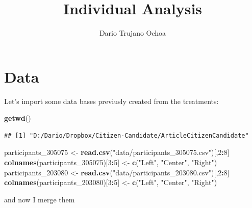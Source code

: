 \documentclass[]{article}
\title{Individual Analysis}
\author{Dario Trujano Ochoa}
\date{}
\newenvironment{Shaded}{\begin{snugshade}}{\end{snugshade}}
\newcommand{\KeywordTok}[1]{\textcolor[rgb]{0.13,0.29,0.53}{\textbf{#1}}}
\newcommand{\DecValTok}[1]{\textcolor[rgb]{0.00,0.00,0.81}{#1}}
\newcommand{\StringTok}[1]{\textcolor[rgb]{0.31,0.60,0.02}{#1}}
\newcommand{\OperatorTok}[1]{\textcolor[rgb]{0.81,0.36,0.00}{\textbf{#1}}}
\newcommand{\NormalTok}[1]{#1}
\begin{document}
\maketitle

{
\setcounter{tocdepth}{2}
\tableofcontents
}
\section{Data}\label{data}

Let's import some data bases previusly created from the treatments:

\begin{Shaded}
\begin{Highlighting}[]
\KeywordTok{getwd}\NormalTok{()}
\end{Highlighting}
\end{Shaded}

\begin{verbatim}
## [1] "D:/Dario/Dropbox/Citizen-Candidate/ArticleCitizenCandidate"
\end{verbatim}

\begin{Shaded}
\begin{Highlighting}[]
\NormalTok{participants_}\DecValTok{305075}\NormalTok{ <-}\StringTok{ }\KeywordTok{read.csv}\NormalTok{(}\StringTok{"data/participants_305075.csv"}\NormalTok{)[,}\DecValTok{2}\OperatorTok{:}\DecValTok{8}\NormalTok{]}
\KeywordTok{colnames}\NormalTok{(participants_}\DecValTok{305075}\NormalTok{)[}\DecValTok{3}\OperatorTok{:}\DecValTok{5}\NormalTok{] <-}\StringTok{ }\KeywordTok{c}\NormalTok{(}\StringTok{"Left"}\NormalTok{, }\StringTok{"Center"}\NormalTok{, }\StringTok{"Right"}\NormalTok{)}
\NormalTok{participants_}\DecValTok{203080}\NormalTok{ <-}\StringTok{ }\KeywordTok{read.csv}\NormalTok{(}\StringTok{"data/participants_203080.csv"}\NormalTok{)[,}\DecValTok{2}\OperatorTok{:}\DecValTok{8}\NormalTok{]}
\KeywordTok{colnames}\NormalTok{(participants_}\DecValTok{203080}\NormalTok{)[}\DecValTok{3}\OperatorTok{:}\DecValTok{5}\NormalTok{] <-}\StringTok{ }\KeywordTok{c}\NormalTok{(}\StringTok{"Left"}\NormalTok{, }\StringTok{"Center"}\NormalTok{, }\StringTok{"Right"}\NormalTok{)}
\end{Highlighting}
\end{Shaded}

and now I merge them
\end{document}
